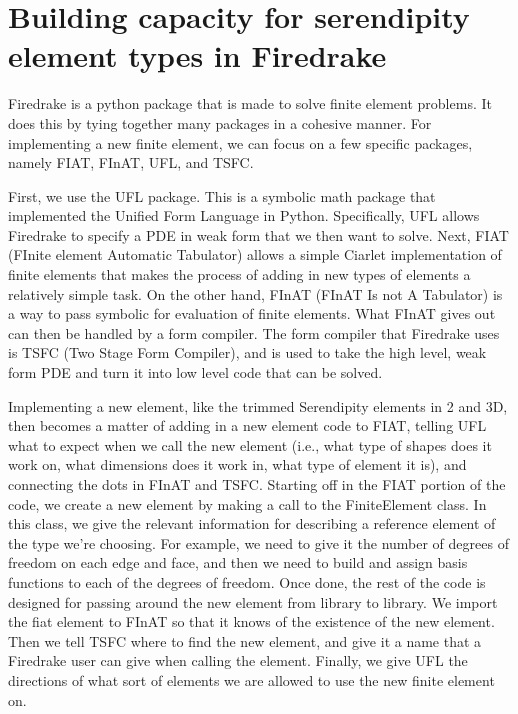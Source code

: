 \documentclass[manuscript,screen]{acmart}
\begin{document}
  \section{Building capacity for serendipity element types in Firedrake}
  
  Firedrake is a python package that is made to solve finite element problems.  It does this by tying together many packages in a cohesive manner.  For implementing a new finite element, we can focus on a few specific packages, namely FIAT, FInAT, UFL, and TSFC.  
  
  First, we use the UFL package.  This is a symbolic math package that implemented the Unified Form Language in Python.  Specifically, UFL allows Firedrake to specify a PDE in weak form that we then want to solve.  Next, FIAT (FInite element Automatic Tabulator) allows a simple Ciarlet implementation of finite elements that makes the process of adding in new types of elements a relatively simple task.  On the other hand, FInAT (FInAT Is not A Tabulator) is a way to pass symbolic for evaluation of finite elements.  What FInAT gives out can then be handled by a form compiler.  The form compiler that Firedrake uses is TSFC (Two Stage Form Compiler), and is used to take the high level, weak form PDE and turn it into low level code that can be solved.  
  
   Implementing a new element, like the trimmed Serendipity elements in 2 and 3D, then becomes a matter of adding in a new element code to FIAT, telling UFL what to expect when we call the new element (i.e., what type of shapes does it work on, what dimensions does it work in, what type of element it is), and connecting the dots in FInAT and TSFC.  Starting off in the FIAT portion of the code, we create a new element by making a call to the FiniteElement class.  In this class, we give the relevant information for describing a reference element of the type we're choosing.  For example, we need to give it the number of degrees of freedom on each edge and face, and then we need to build and assign basis functions to each of the degrees of freedom.   Once done, the rest of the code is designed for passing around the new element from library to library.  We import the fiat element to FInAT so that it knows of the existence of the new element.  Then we tell TSFC where to find the new element, and give it a name that a Firedrake user can give when calling the element.  Finally, we give UFL the directions of what sort of elements we are allowed to use the new finite element on.    
  
\end{document}
